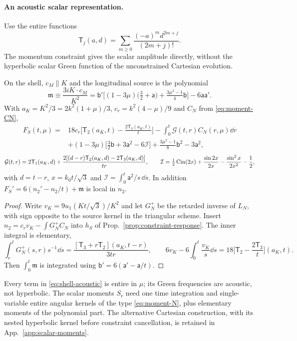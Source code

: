 \paragraph{An acoustic scalar representation.}
Use the entire functions
\[
\mathsf T_j(a,d)=\sum_{m\ge0}\frac{(-a)^md^{2m+j}}{(2m+j)!}.
\]
The momentum constraint gives the scalar amplitude directly, without the hyperbolic
scalar Green function of the unconstrained Cartesian evolution.

\begin{proposition}\label{prop:shell-acoustic}
On the shell, $c_M\parallel K$ and the longitudinal source is the polynomial
\[
 \mathfrak m\equiv\frac{3iK\cdot c_M}{K^2}
 =\mathsf b'\Big[(1-3\mu)\big(\tfrac32+\mathsf a\big)+\tfrac{3\mu^2-1}4\mathsf b\Big]-6\mathsf a\mathsf a'.
\]
With $a_K=K^2/3=2k^2(1+\mu)/3$, $c_r=k^2(4-\mu)/9$ and $C_N$ from \eqref{eq:moment-CN},
\begin{equation}\label{eq:shell-acoustic}
\boxed{\begin{aligned}
 F_S(t,\mu)={}&18c_r\Big[\mathsf T_2(a_K,t)-\frac{2\mathsf T_3(a_K,t)}t\Big]
 -\int_0^t\mathcal G(t,r)C_N(r,\mu)\dd r\\
 &+(1-3\mu)\big[\tfrac32\mathsf b+3\mathsf a^2-6\mathcal I\big]+\tfrac{3\mu^2-1}8\mathsf b^2-3\mathsf a^2,
\end{aligned}}
\end{equation}
\[
 \mathcal G(t,r)=2\mathsf T_1(a_K,d)+\frac{2[(d-r)\mathsf T_2(a_K,d)-2\mathsf T_3(a_K,d)]}{tr},\qquad
 \mathcal I=\tfrac12\operatorname{Cin}(2x)+\frac{\sin2x}{2x}-\frac{\sin^2x}{2x^2}-\frac12,
\]
with $d=t-r$, $x=k_0t/\sqrt3$ and $\mathcal I=\int_0^t\mathsf a^2/s\,\dd s$. In addition
$F_S'=6(n_2'-n_2/t)+\mathfrak m$ is local in $n_2$.
\end{proposition}
\begin{proof}
Write $v_K=9u_1(Kt/\sqrt3)/K^2$ and let $G_N^+$ be the retarded inverse of $L_N$,
with sign opposite to the source kernel in the triangular scheme. Insert
$n_2=c_rv_K-\int G_N^+C_N$ into $h_S$ of Prop.~\ref{prop:constraint-response}. The inner
integral is elementary,
\[
 \int_r^tG_N^+(s,r)s^{-1}\dd s=\frac{[\mathsf T_3+r\mathsf T_2](a_K,t-r)}{3tr},\qquad
 6v_K-6\int_0^t\frac{v_K}s\dd s=18\Big[\mathsf T_2-\frac{2\mathsf T_3}t\Big](a_K,t).
\] Then $\int_0^t\mathfrak m$ is integrated using
$\mathsf b'=6(\mathsf a'-\mathsf a/t)$.
\end{proof}
Every term in \eqref{eq:shell-acoustic} is entire in $\mu$; its Green frequencies are acoustic,
not hyperbolic. The scalar moments $S_r$ need one time integration and single-variable entire
angular kernels of the type \eqref{eq:moment-N}, plus elementary moments of the polynomial part.
The alternative Cartesian construction, with its nested hyperbolic kernel before constraint
cancellation, is retained in App.~\ref{app:scalar-moments}.

